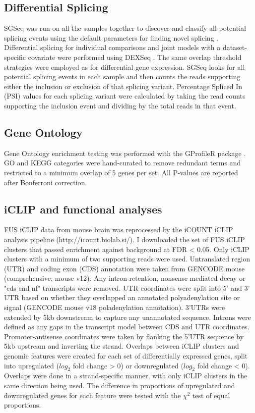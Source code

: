 \subsection{Differential Splicing}
SGSeq was run on all the samples together to discover and classify all potential splicing events using the default parameters for finding novel splicing \citep{Goldstein2016}. 
Differential splicing for individual comparisons and joint models with a dataset-specific covariate were performed using DEXSeq \citep{Anders2012}.
The same overlap threshold strategies were employed as for differential gene expression.
SGSeq looks for all potential splicing events in each sample and then counts the reads supporting either the inclusion or exclusion of that splicing variant. 
Percentage Spliced In (PSI) values  \citep{Katz2010-ir} for each splicing variant were calculated by taking the read counts supporting the inclusion event and dividing by the total reads in that event. 

\subsection{Gene Ontology}
Gene Ontology enrichment testing was performed with the GProfileR package \citep{Reimand2016}. 
GO and KEGG categories were hand-curated to remove redundant terms and restricted to a minimum overlap of 5 genes per set. 
All P-values  are reported after Bonferroni correction. 

\subsection{iCLIP and functional analyses}

FUS iCLIP data from mouse brain \citep{Rogelj2012} was reprocessed by the iCOUNT iCLIP analysis pipeline (http://icount.biolab.si/). 
I downloaded the set of FUS iCLIP clusters that passed enrichment against background at FDR < 0.05. 
Only iCLIP clusters with a minimum of two supporting reads were used. 
Untranslated region (UTR) and coding exon (CDS) annotation were taken from GENCODE mouse (comprehensive; mouse v12). Any intron-retention, nonsense mediated decay or "cds end nf" transcripts were removed. 
UTR coordinates were split into 5' and 3' UTR based on whether they overlapped an annotated polyadenylation site or signal (GENCODE mouse v18 poladenylation annotation). 
3'UTRs were extended by 5kb downstream to capture any unannotated sequence.
Introns were defined as any gaps in the transcript model between CDS and UTR coordinates.
Promoter-antisense coordinates were taken by flanking the 5'UTR sequence by 5kb upstream and inverting the strand.
Overlaps between iCLIP clusters and genomic features were created for each set of differentially expressed genes, split into upregulated ($log_2$ fold change > 0) or downregulated ($log_2$ fold change < 0). 
Overlaps were done in a strand-specific manner, with only iCLIP clusters in the same direction being used.
The difference in proportions of upregulated and downregulated genes for each feature were tested with the $\chi^2$ test of equal proportions.

